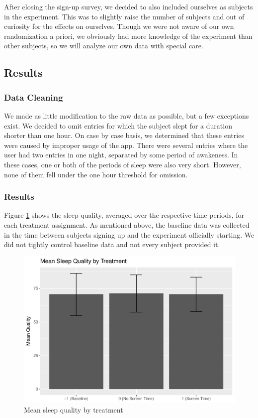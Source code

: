 \documentclass[]{article}
\begin{document}
After closing the sign-up survey, we decided to also included ourselves
as subjects in the experiment. This was to slightly raise the number of
subjects and out of curiosity for the effects on ourselves. Though we
were not aware of our own randomization a priori, we obviously had more
knowledge of the experiment than other subjects, so we will analyze our
own data with special care.

\hypertarget{results}{%
\subsection{Results}\label{results}}

\hypertarget{data-cleaning}{%
\subsubsection{Data Cleaning}\label{data-cleaning}}

We made as little modification to the raw data as possible, but a few
exceptions exist. We decided to omit entries for which the subject slept
for a duration shorter than one hour. On case by case basis, we
determined that these entries were caused by improper usage of the app.
There were several entries where the user had two entries in one night,
separated by some period of awakeness. In these cases, one or both of
the periods of sleep were also very short. However, none of them fell
under the one hour threshold for omission.

\hypertarget{results-1}{%
\subsubsection{Results}\label{results-1}}

Figure \ref{fig:mean_quality} shows the sleep quality, averaged over the
respective time periods, for each treatment assignment. As mentioned
above, the baseline data was collected in the time between subjects
signing up and the experiment officially starting. We did not tightly
control baseline data and not every subject provided it.

\begin{figure}
\centering
\includegraphics{report_files/figure-latex/mean_quality-1.pdf}
\caption{\label{fig:mean_quality} Mean sleep quality by treatment}
\end{figure}
\end{document}
